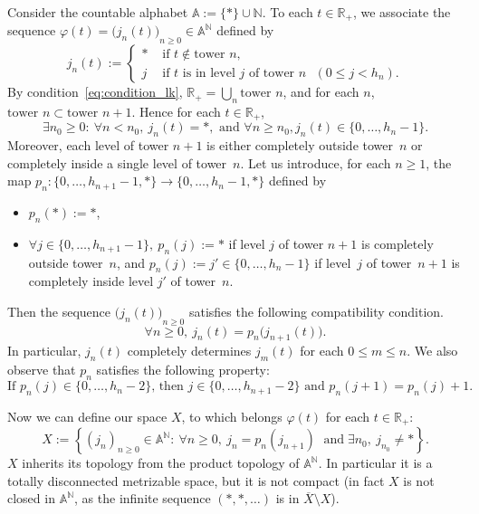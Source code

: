 \documentclass[AHL,Unicode,longabstracts]{cedram}
\newcommand{\egdef}{:=}
\renewcommand{\AA}{\mathbb{A}}
\newcommand{\RR}{\mathbb{R}}
\newcommand{\NN}{\mathbb{N}}
\let\oldexists\exists
\renewcommand*{\exists}{\mathrel{\oldexists}}
\let\oldforall\forall
\renewcommand*{\forall}{\mathrel{\oldforall}}
\begin{document}
Consider the countable alphabet $\AA\egdef\{\ast\}\cup\NN$. To each $t\in\RR_+$, we associate the sequence $\varphi(t)={\bigl(j_n(t)\bigr)}_{n\ge0}\in\AA^\NN$ defined by
\[
j_n(t)\egdef
\begin{cases}
\ast &\text{ if }t\notin\text{tower }n,\\
j &\text{ if }t\text{ is in level $j$ of tower $n$ }(0\le j<h_n).
\end{cases}
\]
By condition~\eqref{eq:condition_lk}, $\RR_+=\bigcup_n \text{tower }n$, and for each $n$, $\text{tower }n\subset \text{tower }n+1$. Hence for each $t\in\RR_+$,
\begin{equation*}\label{eq:sequences-C1}
\exists n_0\ge0:\ \forall n<n_0,\ j_n(t)=\ast, \text{ and } \forall n\ge n_0, j_n(t)\in\{0,\ldots,h_n-1\}.
\end{equation*}
Moreover, each level of tower $n+1$ is either completely outside tower~$n$ or completely inside a single level of tower~$n$. Let us introduce, for each $n\ge1$, the map $p_n:\{0,\ldots, h_{n+1}-1,\ast\}\to \{0,\ldots, h_{n}-1,\ast\}$ defined by
\begin{itemize}
\item $p_n(\ast)\egdef\ast$,
\item $\forall j\in\{0,\ldots, h_{n+1}-1\},\ p_n(j)\egdef \ast$ if level $j$ of tower $n+1$ is completely outside tower~$n$, and $p_n(j)\egdef j'\in\{0,\ldots, h_{n}-1\}$ if level~$j$ of tower~$n+1$ is completely inside level $j'$ of tower~$n$.
\end{itemize}
Then the sequence ${\bigl(j_n(t)\bigr)}_{n\ge0}$ satisfies the following compatibility condition.
\begin{equation*}\label{eq:sequences-C2}
\forall n\ge0,\ j_n(t)=p_n\bigl(j_{n+1}(t)\bigr).
\end{equation*}
In particular, $j_n(t)$ completely determines $j_m(t)$ for each $0\le m\le n$. We also observe that $p_n$ satisfies the following property:
\begin{equation}\label{eq:prop_pn}
\text{If }p_n(j)\in\{0,\ldots,h_n-2\}\text{, then }j\in\{0,\ldots,h_{n+1}-2\}\text{ and }p_n(j+1)=p_n(j)+1.
\end{equation}

Now we can define our space $X$, to which belongs $\varphi(t)$ for each $t\in\RR_+$:
\[
X\egdef \left\{(j_n)_{n\ge0}\in\AA^{\NN}:\ \forall n\ge0,\ j_n=p_n(j_{n+1})\;\text{ and}\;\exists n_0,\ j_{n_0}\neq\ast \right\}.
\]
$X$ inherits its topology from the product topology of $\AA^{\NN}$. In particular it is a totally disconnected metrizable space, but it is not compact (in fact $X$ is not closed in $\AA^{\NN}$, as the infinite sequence $(\ast,\ast,\ldots)$ is in $\overline{X}\setminus X$).
\end{document}
